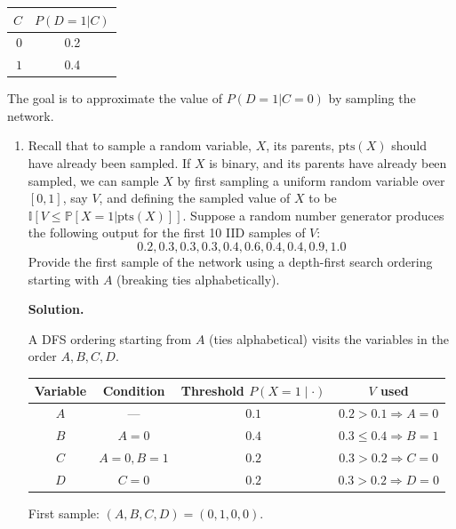 \documentclass[12pt]{article}
\newenvironment{solution}{%
  \ifshowsolutions\begin{solutionbox}\noindent\textbf{\color{blue!70!black}Solution.}\quad\fi
  \ifshowsolutions\else\expandafter\comment\fi
}{%
  \ifshowsolutions\end{solutionbox}\fi
  \ifshowsolutions\else\expandafter\endcomment\fi
}
\begin{document}
\begin{enumerate}
\begin{enumerate}
\begin{table}[H]
\begin{tabular}{|r|c|}
            \hline
            $C$ & $P(D=1|C)$ \\\hline
            $0$ & 0.2        \\\hline
            $1$ & 0.4        \\\hline
          \end{tabular}
        \end{table}
        The goal is to approximate the value of $P(D=1|C=0)$ by sampling the network.
        \begin{enumerate}
          \item Recall that to sample a random variable, $X$, its parents, $\text{pts}(X)$ should have already been sampled. If $X$ is binary, and its parents have already been sampled, we can sample $X$ by first sampling a uniform random variable over $[0, 1]$, say $V$, and defining the sampled value of $X$ to be $\mathbb{I}[V \leq \mathbb{P}[X = 1 | \text{pts}(X)]]$. Suppose a random number generator produces the following output for the first 10 IID samples of $V$:
                \[0.2, 0.3, 0.3, 0.3, 0.4, 0.6, 0.4, 0.4, 0.9, 1.0\]
                Provide the first sample of the network using a depth-first search ordering starting with $A$ (breaking ties alphabetically).

          \begin{solution}
            A DFS ordering starting from $A$ (ties alphabetical) visits the variables in the order $A, B, C, D$.

            \begin{center}
            \begin{tabular}{cccc}
              Variable & Condition & Threshold $P(X=1\mid\cdot)$ & $V$ used \\\hline
              $A$ & --- & $0.1$ & $0.2 > 0.1 \Rightarrow A=0$ \\
              $B$ & $A=0$ & $0.4$ & $0.3 \leq 0.4 \Rightarrow B=1$ \\
              $C$ & $A=0,B=1$ & $0.2$ & $0.3 > 0.2 \Rightarrow C=0$ \\
              $D$ & $C=0$ & $0.2$ & $0.3 > 0.2 \Rightarrow D=0$ \\
            \end{tabular}
            \end{center}

            First sample: $(A, B, C, D) = (0, 1, 0, 0)$.
          \end{solution}


\end{enumerate}
\end{enumerate}
\end{enumerate}
\end{document}
